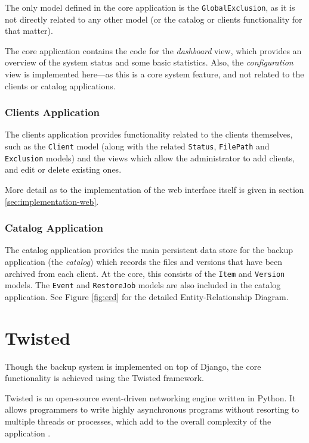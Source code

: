 The only model defined in the core application is the \verb!GlobalExclusion!,
as it is not directly related to any other model (or the catalog or clients
functionality for that matter).

The core application contains the code for the \emph{dashboard} view, which
provides an overview of the system status and some basic statistics. Also, the
\emph{configuration} view is implemented here---as this is a core system
feature, and not related to the clients or catalog applications.

\subsubsection{Clients Application}
\label{sec:implementation-django-structure-clients}

The clients application provides functionality related to the clients
themselves, such as the \verb!Client! model (along with the related
\verb!Status!, \verb!FilePath! and \verb!Exclusion! models) and the views which
allow the administrator to add clients, and edit or delete existing ones.

More detail as to the implementation of the web interface itself is given in
section \ref{sec:implementation-web}.

\subsubsection{Catalog Application}
\label{sec:implementation-django-structure-catalog}

The catalog application provides the main persistent data store for the backup
application (the \emph{catalog}) which records the files and versions that have
been archived from each client. At the core, this consists of the \verb!Item!
and \verb!Version! models. The \verb!Event! and \verb!RestoreJob! models are
also included in the catalog application. See Figure \ref{fig:erd} for the
detailed Entity-Relationship Diagram.

\section{Twisted}
\label{sec:implementation-twisted}

Though the backup system is implemented on top of Django, the core
functionality is achieved using the Twisted framework.

Twisted is an open-source event-driven networking engine written in Python. It
allows programmers to write highly asynchronous programs without resorting to
multiple threads or processes, which add to the overall complexity of the
application \cite{kinder2005}.

